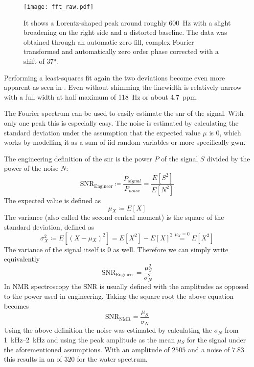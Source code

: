 \begin{figure}[h!bt]
    \centering
    \texttt{[image: fft\_raw.pdf]}
    \caption{ It shows a Lorentz-shaped peak around roughly \qty{600}{\hertz} with a slight broadening on the right side and a distorted baseline. The data was obtained through an automatic zero fill, complex Fourier transformed and automatically zero order phase corrected with a shift of \ang{37}.}
\end{figure}

Performing a least-squares fit again the two deviations become even more apparent as seen in . Even without shimming the linewidth is relatively narrow with a full width at half maximum of \qty{118}{\hertz} or about \qty{4.7}{ppm}.

The Fourier spectrum can be used to easily estimate the \acrfull{snr} of the signal. With only one peak this is especially easy. The noise is estimated by calculating the standard deviation under the assumption that the expected value \(\mu{}\) is \(0\), which works by modelling it as a sum of \acrfull{iid} random variables or more specifically \acrfull{gwn}.

The engineering definition of the \acrshort{snr} is the power \(P\) of the signal \(S\) divided by the power of the noise \(N\):
\[
    \text{SNR}_{\text{Engineer}} \coloneqq \frac{P_{signal}}{P_{noise}} = \frac{E[S^2]}{E[N^2]}
\]
The expected value is defined as
\[
    \mu{}_X \coloneqq E[X]
\]
The variance (also called the second central moment) is the square of the standard deviation, defined as
\[
    \sigma{}_X^2 \coloneqq E[(X-\mu{}_X)^2] = E[X^2] - E[X]^2 \stackrel{\mu{}_X = 0}{=} E[X^2]
\]
The variance of the signal itself is \(0\) as well. Therefore we can simply write equivalently
\[
    \text{SNR}_{\text{Engineer}} = \frac{\mu{}_S^2}{\sigma{}_N^2}
\]
In NMR spectroscopy the SNR is usually defined with the amplitudes as opposed to the power used in engineering. Taking the square root the above equation becomes
\[
    \text{SNR}_{\text{NMR}} = \frac{\mu_S}{\sigma_N}
\]
Using the above definition the noise was estimated by calculating the \(\sigma{}_N\) from \qtyrange{1}{2}{\kilo\hertz} and using the peak amplitude as the mean \(\mu{}_S\) for the signal under the aforementioned assumptions. With an amplitude of \(2505\) and a noise of \(7.83\) this results in an \snrnmr{} of \(320\) for the water spectrum.

